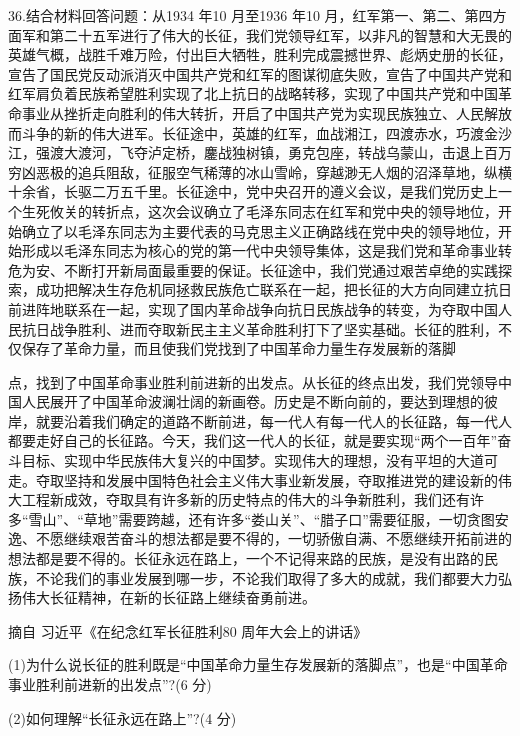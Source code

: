 \documentclass[UTF8,11pt]{ctexart}
\begin{document}
36.结合材料回答问题：从1934 年10 月至1936 年10 月，红军第一、第二、第四方面军和第二十五军进行了伟大的长征，我们党领导红军，以非凡的智慧和大无畏的英雄气概，战胜千难万险，付出巨大牺牲，胜利完成震撼世界、彪炳史册的长征，宣告了国民党反动派消灭中国共产党和红军的图谋彻底失败，宣告了中国共产党和红军肩负着民族希望胜利实现了北上抗日的战略转移，实现了中国共产党和中国革命事业从挫折走向胜利的伟大转折，开启了中国共产党为实现民族独立、人民解放而斗争的新的伟大进军。长征途中，英雄的红军，血战湘江，四渡赤水，巧渡金沙江，强渡大渡河，飞夺泸定桥，鏖战独树镇，勇克包座，转战乌蒙山，击退上百万穷凶恶极的追兵阻敌，征服空气稀薄的冰山雪岭，穿越渺无人烟的沼泽草地，纵横十余省，长驱二万五千里。长征途中，党中央召开的遵义会议，是我们党历史上一个生死攸关的转折点，这次会议确立了毛泽东同志在红军和党中央的领导地位，开始确立了以毛泽东同志为主要代表的马克思主义正确路线在党中央的领导地位，开始形成以毛泽东同志为核心的党的第一代中央领导集体，这是我们党和革命事业转危为安、不断打开新局面最重要的保证。长征途中，我们党通过艰苦卓绝的实践探索，成功把解决生存危机同拯救民族危亡联系在一起，把长征的大方向同建立抗日前进阵地联系在一起，实现了国内革命战争向抗日民族战争的转变，为夺取中国人民抗日战争胜利、进而夺取新民主主义革命胜利打下了坚实基础。长征的胜利，不仅保存了革命力量，而且使我们党找到了中国革命力量生存发展新的落脚


点，找到了中国革命事业胜利前进新的出发点。从长征的终点出发，我们党领导中国人民展开了中国革命波澜壮阔的新画卷。历史是不断向前的，要达到理想的彼岸，就要沿着我们确定的道路不断前进，每一代人有每一代人的长征路，每一代人都要走好自己的长征路。今天，我们这一代人的长征，就是要实现“两个一百年”奋斗目标、实现中华民族伟大复兴的中国梦。实现伟大的理想，没有平坦的大道可走。夺取坚持和发展中国特色社会主义伟大事业新发展，夺取推进党的建设新的伟大工程新成效，夺取具有许多新的历史特点的伟大的斗争新胜利，我们还有许多“雪山”、“草地”需要跨越，还有许多“娄山关”、“腊子口”需要征服，一切贪图安逸、不愿继续艰苦奋斗的想法都是要不得的，一切骄傲自满、不愿继续开拓前进的想法都是要不得的。长征永远在路上，一个不记得来路的民族，是没有出路的民族，不论我们的事业发展到哪一步，不论我们取得了多大的成就，我们都要大力弘扬伟大长征精神，在新的长征路上继续奋勇前进。

摘自 习近平《在纪念红军长征胜利80 周年大会上的讲话》

(1)为什么说长征的胜利既是“中国革命力量生存发展新的落脚点”，也是“中国革命事业胜利前进新的出发点”?(6 分)


(2)如何理解“长征永远在路上”?(4 分)
\end{document}
